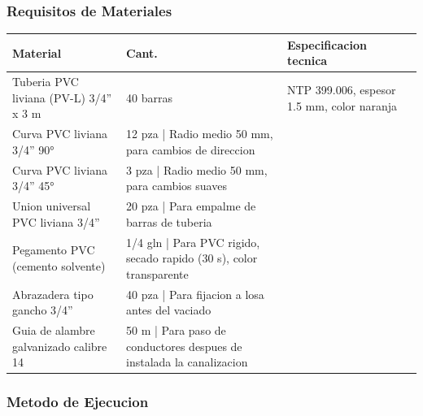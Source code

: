 \subsubsection{Requisitos de Materiales}

\begin{longtable}{L{5.0cm} L{2.0cm} L{7.5cm}}
\toprule
\textbf{Material} & \textbf{Cant.} & \textbf{Especificacion tecnica} \\
\midrule
Tuberia PVC liviana (PV-L) 3/4'' x 3 m & 40 barras & NTP 399.006, espesor 1.5 mm, color naranja \\
Curva PVC liviana 3/4'' 90° & 12 pza | Radio medio 50 mm, para cambios de direccion \\
Curva PVC liviana 3/4'' 45° & 3 pza | Radio medio 50 mm, para cambios suaves \\
Union universal PVC liviana 3/4'' & 20 pza | Para empalme de barras de tuberia \\
Pegamento PVC (cemento solvente) & 1/4 gln | Para PVC rigido, secado rapido (30 s), color transparente \\
Abrazadera tipo gancho 3/4'' & 40 pza | Para fijacion a losa antes del vaciado \\
Guia de alambre galvanizado calibre 14 & 50 m | Para paso de conductores despues de instalada la canalizacion \\
\bottomrule
\end{longtable}

\subsubsection{Metodo de Ejecucion}

